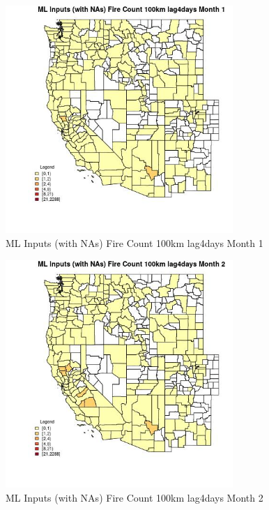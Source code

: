 \begin{figure} 
\centering  
\includegraphics[width=0.77\textwidth]{Code_Outputs/Report_ML_input_PM25_Step4_part_e_de_duplicated_aves_compiled_2019-05-21wNAs_CountyFire_Count_100km_lag4daysmedianMonth1.jpg} 
\caption{\label{fig:Report_ML_input_PM25_Step4_part_e_de_duplicated_aves_compiled_2019-05-21wNAsCountyFire_Count_100km_lag4daysmedianMonth1}ML Inputs (with NAs) Fire Count 100km lag4days Month 1} 
\end{figure} 
 

\begin{figure} 
\centering  
\includegraphics[width=0.77\textwidth]{Code_Outputs/Report_ML_input_PM25_Step4_part_e_de_duplicated_aves_compiled_2019-05-21wNAs_CountyFire_Count_100km_lag4daysmedianMonth2.jpg} 
\caption{\label{fig:Report_ML_input_PM25_Step4_part_e_de_duplicated_aves_compiled_2019-05-21wNAsCountyFire_Count_100km_lag4daysmedianMonth2}ML Inputs (with NAs) Fire Count 100km lag4days Month 2} 
\end{figure} 
 

